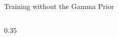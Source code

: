 \begin{frame}{Training without the Gamma Prior}
\begin{columns}[c,onlytextwidth]
\begin{column}{0.35\textwidth}
{\begin{minipage}{\dimexpr\linewidth+5mm\relax}
\begin{itemize}
\end{itemize}
\end{minipage}%
}
\end{column}
\end{columns}
\par\vspace{0.5mm}
\end{frame}

